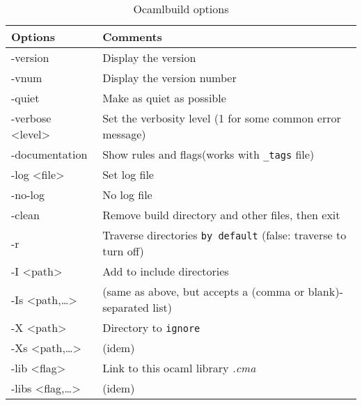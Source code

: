 \documentclass[11pt]{article}
\begin{document}
\begin{table}[htb]
\caption{Ocamlbuild options} \label{tbl:ob_option}
\begin{center}
\begin{tabular}{ll}
 Options                     &  Comments                                                                      \\
\hline
 -version                    &  Display the version                                                           \\
 -vnum                       &  Display the version number                                                    \\
 -quiet                      &  Make as quiet as possible                                                     \\
 -verbose <level>            &  Set the verbosity level (1 for some common error message)                     \\
 -documentation              &  Show rules and flags(works with \texttt{\_tags} file)                         \\
 -log <file>                 &  Set log file                                                                  \\
 -no-log                     &  No log file                                                                   \\
 -clean                      &  Remove build directory and other files, then exit                             \\
 -r                          &  Traverse directories \texttt{by default} (false: traverse to turn off)        \\
\hline
 -I <path>                   &  Add to include directories                                                    \\
 -Is <path,\ldots{}>         &  (same as above, but accepts a (comma or blank)-separated list)                \\
 -X <path>                   &  Directory to \texttt{ignore}                                                  \\
 -Xs <path,\ldots{}>         &  (idem)                                                                        \\
 -lib <flag>                 &  Link to this ocaml library \emph{.cma}                                        \\
 -libs <flag,\ldots{}>       &  (idem)                                                                        \\

\end{tabular}
\end{center}
\end{table}
\end{document}

